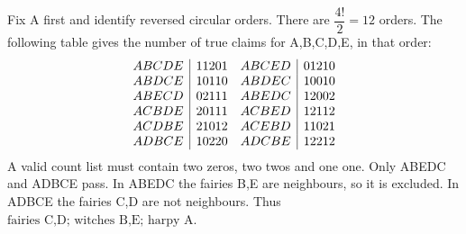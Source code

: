 Fix A first and identify reversed circular orders. There are $\dfrac{4 !}{2} = 12$ orders. The following table gives the number of true claims for A,B,C,D,E, in that order:\[\begin{array}{c|c@{\quad}c|c}ABCDE&11201&ABCED&01210\\ABDCE&10110&ABDEC&10010\\ABECD&02111&ABEDC&12002\\ACBDE&20111&ACBED&12112\\ACDBE&21012&ACEBD&11021\\ADBCE&10220&ADCBE&12212\end{array}\]A valid count list must contain two zeros, two twos and one one. Only ABEDC and ADBCE pass. In ABEDC the fairies B,E are neighbours, so it is excluded. In ADBCE the fairies C,D are not neighbours. Thus $\boxed{\text{fairies C,D; witches B,E; harpy A}}$.
